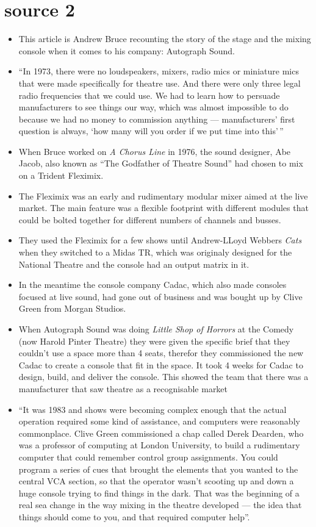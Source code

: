 \documentclass[12pt]{article}
\begin{document}
    \section{source 2 \autocite{bruceTheatreSoundDigital}}
        \begin{itemize}
            \item This article is Andrew Bruce recounting the story of the stage and the mixing console when it comes to his company: Autograph Sound.
            \item ``In 1973, there were no loudspeakers, mixers, radio mics or miniature mics that were made specifically for theatre use. And there were only three legal radio frequencies that we could use. We had to learn how to persuade manufacturers to see things our way, which was almost impossible to do because we had no money to commission anything --- manufacturers' first question is always, `how many will you order if we put time into this'\,''
            \item When Bruce worked on \textit{A Chorus Line} in 1976, the sound designer, Abe Jacob, also known as ``The Godfather of Theatre Sound'' had chosen to mix on a Trident Fleximix.
            \item The Fleximix was an early and rudimentary modular mixer aimed at the live market. The main feature was a flexible footprint with different modules that could be bolted together for different numbers of channels and busses.
            \item They used the Fleximix for a few shows until Andrew-LLoyd Webbers \textit{Cats} when they switched to a Midas TR, which was originaly designed for the National Theatre and the console had an output matrix in it.
            \item In the meantime the console company Cadac, which also made consoles focused at live sound, had gone out of business and was bought up by Clive Green from Morgan Studios.
            \item When Autograph Sound was doing \textit{Little Shop of Horrors} at the Comedy (now Harold Pinter Theatre) they were given the specific brief that they couldn't use a space more than 4 seats, therefor they commissioned the new Cadac to create a console that fit in the space. It took 4 weeks for Cadac to design, build, and deliver the console. This showed the team that there was a manufacturer that saw theatre as a recognisable market
            \item ``It was 1983 and shows were becoming complex enough that the actual operation required some kind of assistance, and computers were reasonably commonplace. Clive Green commissioned a chap called Derek Dearden, who was a professor of computing at London University, to build a rudimentary computer that could remember control group assignments. You could program a series of cues that brought the elements that you wanted to the central VCA section, so that the operator wasn't scooting up and down a huge console trying to find things in the dark. That was the beginning of a real sea change in the way mixing in the theatre developed --- the idea that things should come to you, and that required computer help''.

\end{itemize}
\end{document}
